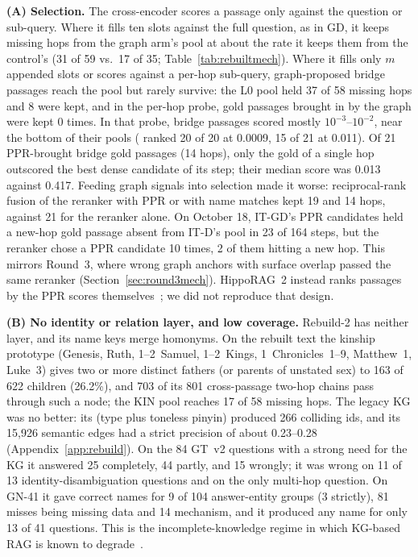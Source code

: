 \textbf{(A) Selection.} The cross-encoder scores a passage only against
the question or sub-query. Where it fills ten slots against the full
question, as in GD, it keeps missing hops from the graph arm's pool at
about the rate it keeps them from the control's (31 of 59 vs.\ 17 of 35;
Table~\ref{tab:rebuiltmech}). Where it fills only $m$ appended slots or
scores against a per-hop sub-query, graph-proposed bridge passages reach
the pool but rarely survive: the L0 pool held 37 of 58 missing hops and 8
were kept, and in the per-hop probe, gold passages brought in by the
graph were kept 0 times. In that probe, bridge passages scored mostly
$10^{-3}$--$10^{-2}$,
near the bottom of their pools (\eg {} ranked 20 of 20 at
0.0009,  15 of 21 at 0.011). Of 21 PPR-brought bridge
gold passages (14 hops), only the gold of a single hop outscored the best
dense candidate of its step; their median score was 0.013 against 0.417. Feeding graph
signals into selection made it worse: reciprocal-rank fusion of the
reranker with PPR or with name matches kept 19 and 14 hops, against 21
for the reranker alone. On October 18, IT-GD's PPR candidates held a
new-hop gold passage absent from IT-D's pool in 23 of 164 steps, but the
reranker chose a PPR candidate 10 times, 2 of them hitting a new hop. This
mirrors Round~3, where wrong graph anchors with surface overlap passed
the same reranker (Section~\ref{sec:round3mech}). HippoRAG~2 instead
ranks passages by the PPR scores themselves~\cite{gutierrez2025hipporag2};
we did not reproduce that design.

\textbf{(B) No identity or relation layer, and low coverage.} Rebuild-2
has neither layer, and its name keys merge homonyms. On the rebuilt text
the kinship prototype (Genesis, Ruth, 1--2~Samuel, 1--2~Kings,
1~Chronicles~1--9, Matthew~1, Luke~3) gives two or more distinct
fathers (or parents of unstated sex) to 163 of 622 children (26.2\%),
and 703 of its 801 cross-passage two-hop chains pass through such a node; the KIN pool
reaches 17 of 58 missing hops. The legacy KG was no better: its
 (type plus toneless pinyin) produced 266 colliding ids,
and its 15{,}926 semantic edges had a strict precision of about
0.23--0.28 (Appendix~\ref{app:rebuild}). On the 84 GT~v2 questions with a
strong need for the KG it answered 25 completely, 44 partly, and 15
wrongly; it was wrong on 11 of 13 identity-disambiguation questions and
on the only multi-hop question. On GN-41 it gave correct names for 9 of
104 answer-entity groups (3 strictly), 81 misses being missing data and
14 mechanism, and it produced any name for only 13 of 41 questions. This
is the incomplete-knowledge regime in which KG-based RAG is known to
degrade~\cite{zhou2025brink}.

